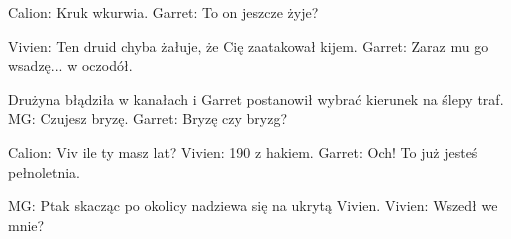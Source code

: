 \documentclass[10pt,twoside,twocolumn]{book}
\begin{document}
%    
%       
Calion: Kruk wkurwia.
Garret: To on jeszcze żyje?

%    
%       
Vivien: Ten druid chyba żałuje, że Cię zaatakował kijem.
Garret: Zaraz mu go wsadzę... w oczodół.

%    
%       
Drużyna błądziła w kanałach i Garret postanowił wybrać kierunek na ślepy traf.
MG: Czujesz bryzę.
Garret: Bryzę czy bryzg?

%    
%       
Calion: Viv ile ty masz lat?
Vivien: 190 z hakiem.
Garret: Och! To już jesteś pełnoletnia.

%    
%       
MG: Ptak skacząc po okolicy nadziewa się na ukrytą Vivien.
Vivien: Wszedł we mnie?
\end{document}
